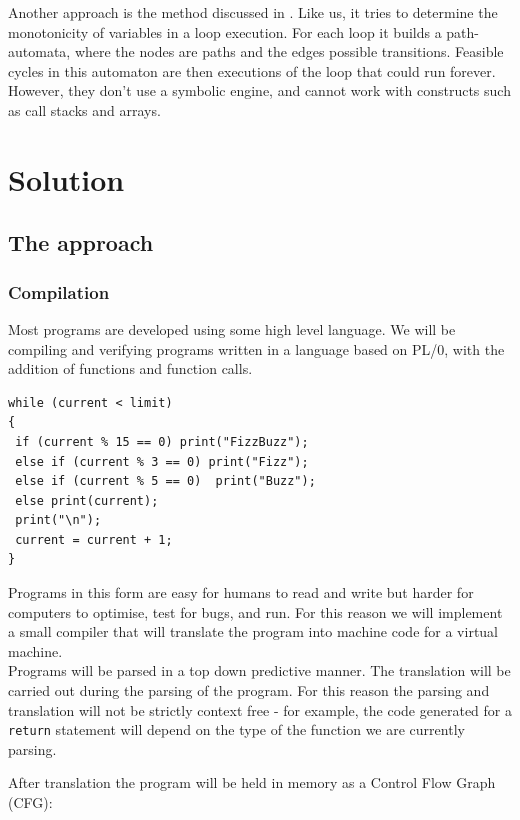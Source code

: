 \documentclass[12pt,a4paper]{article}
\begin{document}
Another approach is the method discussed in \citep{loopster}. Like us, it tries to determine the monotonicity of variables in a loop execution. For each loop it builds a path-automata, where the nodes are paths and the edges possible transitions. Feasible cycles in this automaton are then executions of the loop that could run forever.
However, they don't use a symbolic engine, and cannot work with constructs such as call stacks and arrays.


\section{Solution}
\subsection{The approach}
\subsubsection{Compilation}
Most programs are developed using some high level language. We will be compiling and verifying programs written in a language based on PL/0, with the addition
of functions and function calls.

\begin{lstlisting}[frame=tlrb,language=myLang, caption=Fizzbuzz., label={fizzbuzz}, numbers=none]
while (current < limit)
{
 if (current % 15 == 0) print("FizzBuzz");
 else if (current % 3 == 0) print("Fizz");
 else if (current % 5 == 0)  print("Buzz");
 else print(current);
 print("\n");
 current = current + 1;
}
\end{lstlisting}

Programs in this form are easy for humans to read and write but harder for computers to optimise, test for bugs, and run. For this reason we will implement a small compiler that will translate the program into machine
code for a virtual machine.\\
Programs will be parsed in a top down predictive manner. The translation will be carried out during the parsing of the program. For this reason the parsing and translation will not be strictly context free - for example, the code generated
for a \texttt{return} statement will depend on the type of the function we are currently parsing.\\\par

 After translation the program will be held in memory as a Control Flow Graph (CFG):
 
\end{document}

